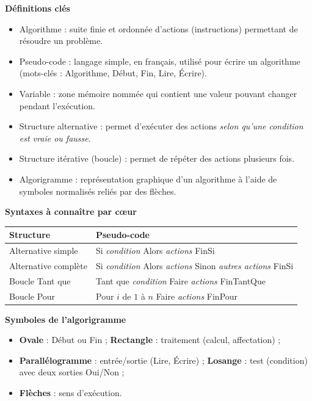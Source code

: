 \documentclass[11pt]{article}
\newcommand{\cle}[1]{{\popxbold\color{popdark}#1}}
\begin{document}
\begin{bilan}
\textbf{Définitions clés}
\begin{itemize}
  \item \cle{Algorithme} : suite finie et ordonnée d'actions (instructions) permettant de résoudre un problème.
  \item \cle{Pseudo-code} : langage simple, en français, utilisé pour écrire un algorithme (mots-clés : Algorithme, Début, Fin, Lire, Écrire).
  \item \cle{Variable} : zone mémoire nommée qui contient une valeur pouvant changer pendant l'exécution.
  \item \cle{Structure alternative} : permet d'exécuter des actions \emph{selon qu'une condition est vraie ou fausse}.
  \item \cle{Structure itérative} (boucle) : permet de répéter des actions plusieurs fois.
  \item \cle{Algorigramme} : représentation graphique d'un algorithme à l'aide de symboles normalisés reliés par des flèches.
\end{itemize}

\textbf{Syntaxes à connaître par c\oe ur}
\begin{center}
\begin{tabularx}{\linewidth}{|l|X|}
\hline
\rowcolor{popblueL} \textbf{Structure} & \textbf{Pseudo-code} \\
\hline
Alternative simple & Si \emph{condition} Alors \emph{actions} FinSi \\
\hline
Alternative complète & Si \emph{condition} Alors \emph{actions} Sinon \emph{autres actions} FinSi \\
\hline
Boucle Tant que & Tant que \emph{condition} Faire \emph{actions} FinTantQue \\
\hline
Boucle Pour & Pour $i$ de $1$ à $n$ Faire \emph{actions} FinPour \\
\hline
\end{tabularx}
\end{center}

\textbf{Symboles de l'algorigramme}
\begin{itemize}
  \item \textbf{Ovale} : Début ou Fin ; \quad \textbf{Rectangle} : traitement (calcul, affectation) ;
  \item \textbf{Parallélogramme} : entrée/sortie (Lire, Écrire) ; \quad \textbf{Losange} : test (condition) avec deux sorties Oui/Non ;
  \item \textbf{Flèches} : sens d'exécution.
\end{itemize}


\end{bilan}
\end{document}
